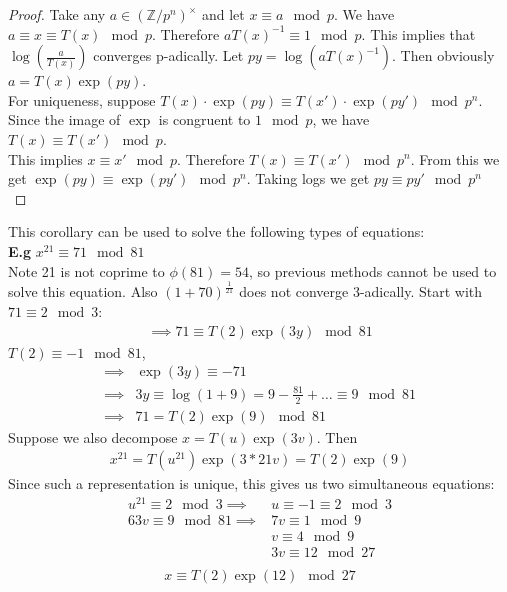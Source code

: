 \documentclass[11pt]{article}
\begin{document}
\begin{proof}
	Take any $a \in (\mathbb{Z}/p^n)^\times $ and let $x \equiv a \mod p $. We have $a \equiv x \equiv T(x) \mod p$. Therefore $aT(x)^{-1} \equiv 1 \mod p$. This implies that $\log(\frac{a}{T(x)})$ converges p-adically. Let $py = \log(aT(x)^{-1})$. Then obviously $a=T(x)\exp(py)$.\\[0.5em]

	For uniqueness, suppose $T(x)\cdot \exp(py) \equiv T(x')\cdot \exp(py') \mod p^n $. Since the image of $\exp$ is congruent to $ 1 \mod p$, we have $T(x) \equiv T(x') \mod p$.\\[0.5em]

	This implies $x\equiv x' \mod p$. Therefore $T(x) \equiv T(x') \mod p^n$. From this we get $\exp(py) \equiv \exp(py') \mod p^n$. Taking logs we get $py \equiv py' \mod p^n$\\[1em] 
\end{proof}
This corollary can be used to solve the following types of equations:\\[0.5em]

\textbf{E.g} $x^{21}\equiv 71 \mod 81$\\
Note 21 is not coprime to $\phi(81) = 54$, so previous methods cannot be used to solve this equation. Also $(1+70)^{\frac{1}{21}}$ does not converge 3-adically. Start with $71\equiv 2 \mod 3$:
\begin{align*} 
	\implies 71 \equiv T(2)\exp(3y) \mod 81
\end{align*}
$T(2) \equiv -1 \mod 81$, 
\begin{align*}
	\implies& \exp(3y) \equiv -71 \\
	\implies& 3y \equiv \log(1+9) = 9 - \frac{81}{2} + \dots \equiv 9 \mod 81\\
	\implies & 71 = T(2) \exp(9) \mod 81
\end{align*}
\newpage	
Suppose we also decompose $x = T(u)\exp(3v)$. Then 
\begin{align*}
	x^{21} = T(u^{21})\exp(3*21v) = T(2) \exp(9)
\end{align*}
Since such a representation is unique, this gives us two simultaneous equations:
\begin{align*}
	u^{21} \equiv 2 \mod 3  \implies&   u\equiv -1 \equiv 2 \mod 3\\[2em]
	63v \equiv 9 \mod 81  \implies&  7v \equiv 1\mod 9\\
	 &v\equiv 4 \mod 9\\
	 &3v\equiv 12 \mod 27\\
\end{align*}
\begin{align*}
	x\equiv T(2)\exp(12) \mod 27
\end{align*}
\end{document}
